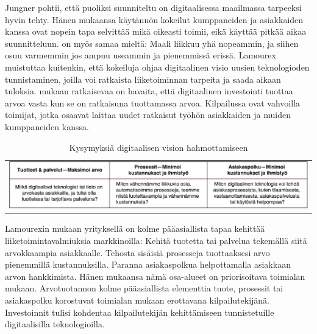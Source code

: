 \documentclass[finnish,12pt,a4paper,pdftex]{article}
\begin{document}
Jungner \citeyearpar{jungner} pohtii, että puoliksi suunniteltu on digitaalisessa maailmassa tarpeeksi hyvin tehty. Hänen mukaansa käytännön kokeilut kumppaneiden ja asiakkaiden kanssa ovat nopein tapa selvittää mikä oikeasti toimii, eikä käyttää pitkää aikaa suunnitteluun. \citeauthor{devops} \citeyearpar{devops} on myös samaa mieltä: Maali liikkuu yhä nopeammin, ja siihen osuu varmemmin jos ampuu useammin ja pienemmissä erissä. Lamourex \citeyearpar{lamoureux} muistuttaa kuitenkin, että kokeiluja ohjaa digitaalinen visio uusien teknologioden tunnistaminen, joilla voi ratkaista liiketoiminnan tarpeita ja saada aikaan tuloksia. \citeauthor{gandhi} \citeyearpar{gandhi} mukaan ratkaisevaa on havaita, että digitaalinen investointi tuottaa arvoa vasta kun se on ratkaisuna tuottamassa arvoa. Kilpailussa ovat vahvoilla toimijat, jotka osaavat laittaa uudet ratkaisut työhön asiakkaiden ja muiden kumppaneiden kanssa.

\begin{table}[]
    \centering
    \begin{tabular}{l}
       \includegraphics[scale=0.45]{images/priorisointi.pdf}
    \end{tabular}
    \caption{Kysymyksiä digitaalisen vision hahmottamiseen \citep{lamoureux}}
    \label{tab:digkys}
\end{table}

Lamourexin \citeyear{lamoureux} mukaan yrityksellä on kolme pääasiallista tapaa kehittää liiketoimintavalmiuksia markkinoilla: Kehitä tuotetta tai palvelua tekemällä siitä arvokkaampia asiakkaalle. Tehosta sisäisiä prosesseja tuottaaksesi arvo pienemmillä kustannuksilla. Paranna asiakaspolkua helpottamalla asiakkaan arvon hankkimista. Hänen mukaansa nämä osa-alueet on priorisoitava toimialan mukaan. Arvotuotannon kolme pääasiallista elementtia tuote, prosessit tai asiakaspolku korostuvat toimialan mukaan erottavana kilpailutekijänä. Investoinnit tulisi kohdentaa kilpailutekijän kehittämiseen tunnistetuille digitaalisilla teknologioilla.
\end{document}
